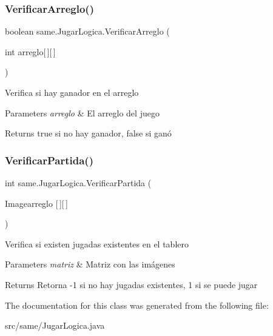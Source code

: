 \subsubsection{\texorpdfstring{Verificar\+Arreglo()}{VerificarArreglo()}}
{\footnotesize\ttfamily boolean same.\+Jugar\+Logica.\+Verificar\+Arreglo (\begin{DoxyParamCaption}\item[{int}]{arreglo\mbox{[}$\,$\mbox{]}\mbox{[}$\,$\mbox{]} }\end{DoxyParamCaption})}

Verifica si hay ganador en el arreglo 
\begin{DoxyParams}{Parameters}
{\em arreglo} & El arreglo del juego \\
\hline
\end{DoxyParams}
\begin{DoxyReturn}{Returns}
true si no hay ganador, false si ganó
\end{DoxyReturn}
\mbox{\label{classsame_1_1_jugar_logica_a24a1f8b23b9276240d46eebdfc3a88ba}} 
\subsubsection{\texorpdfstring{Verificar\+Partida()}{VerificarPartida()}}
{\footnotesize\ttfamily int same.\+Jugar\+Logica.\+Verificar\+Partida (\begin{DoxyParamCaption}\item[{Imagearreglo}]{\mbox{[}$\,$\mbox{]}\mbox{[}$\,$\mbox{]} }\end{DoxyParamCaption})}

Verifica si existen jugadas existentes en el tablero 
\begin{DoxyParams}{Parameters}
{\em matriz} & Matriz con las imágenes \\
\hline
\end{DoxyParams}
\begin{DoxyReturn}{Returns}
Retorna -\/1 si no hay jugadas existentes, 1 si se puede jugar
\end{DoxyReturn}


The documentation for this class was generated from the following file\+:\begin{DoxyCompactItemize}
\item 
src/same/Jugar\+Logica.\+java\end{DoxyCompactItemize}
